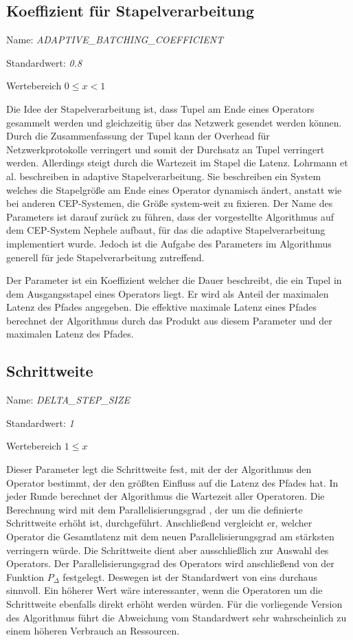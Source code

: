 \subsection{Koeffizient für Stapelverarbeitung}

Name: \textit{ADAPTIVE\_BATCHING\_COEFFICIENT}

Standardwert: \textit{0.8}

Wertebereich \textit{\(0 \leq x < 1\)}

Die Idee der Stapelverarbeitung ist, dass Tupel am Ende eines Operators gesammelt werden und gleichzeitig über das Netzwerk gesendet werden können.
Durch die Zusammenfassung der Tupel kann der Overhead für Netzwerkprotokolle verringert und somit der Durchsatz an Tupel verringert werden.
Allerdings steigt durch die Wartezeit im Stapel die Latenz.
Lohrmann et al. beschreiben in \cite{lohrmann_nephele_2014} adaptive Stapelverarbeitung.
Sie beschreiben ein System welches die Stapelgröße am Ende eines Operator dynamisch ändert, anstatt wie bei anderen CEP-Systemen, die Größe system-weit zu fixieren.
Der Name des Parameters ist darauf zurück zu führen, dass der vorgestellte Algorithmus auf dem CEP-System Nephele aufbaut, für das die adaptive Stapelverarbeitung implementiert wurde.
Jedoch ist die Aufgabe des Parameters im Algorithmus generell für jede Stapelverarbeitung zutreffend.

Der Parameter ist ein Koeffizient welcher die Dauer beschreibt, die ein Tupel in dem Ausgangsstapel eines Operators liegt.
Er wird als Anteil der maximalen Latenz des Pfades angegeben.
Die effektive maximale Latenz eines Pfades berechnet der Algorithmus durch das Produkt aus diesem Parameter und der maximalen Latenz des Pfades.

\subsection{Schrittweite}

Name: \textit{DELTA\_STEP\_SIZE}

Standardwert: \textit{1}

Wertebereich \textit{\(1 \leq x\)}

Dieser Parameter legt die Schrittweite fest, mit der der Algorithmus den Operator bestimmt, der den größten Einfluss auf die Latenz des Pfades hat.
In jeder Runde berechnet der Algorithmus die Wartezeit aller Operatoren.
Die Berechnung wird mit dem Parallelisierungsgrad , der um die definierte Schrittweite erhöht ist, durchgeführt. 
Anschließend vergleicht er, welcher Operator die Gesamtlatenz mit dem neuen Parallelisierungsgrad am stärksten verringern würde.
Die Schrittweite dient aber ausschließlich zur Auswahl des Operators.
Der Parallelisierungsgrad des Operators wird anschließend von der Funktion \(P_\Delta\) festgelegt.
Deswegen ist der Standardwert von eins durchaus sinnvoll.
Ein höherer Wert wäre interessanter, wenn die Operatoren um die Schrittweite ebenfalls direkt erhöht werden würden.
Für die vorliegende Version des Algorithmus führt die Abweichung vom Standardwert sehr wahrscheinlich zu einem höheren Verbrauch an Ressourcen.

